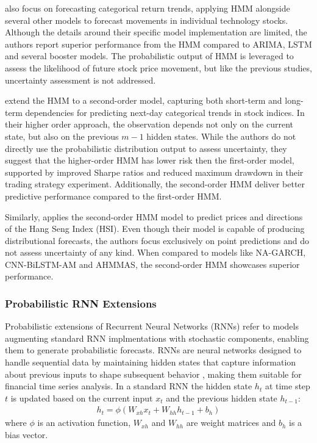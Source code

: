 \textcite{sher2023exploiting} also focus on forecasting categorical return trends, applying HMM alongside several other models to forecast movements in individual technology stocks. Although the details around their specific model implementation are limited, the authors report superior performance from the HMM compared to ARIMA, LSTM and several booster models. The probabilistic output of HMM is leveraged to assess the likelihood of future stock price movement, but like the previous studies, uncertainty assessment is not addressed. 

\textcite{zhang2019high} extend the HMM to a second-order model, capturing both short-term and long-term dependencies for predicting next-day categorical trends in stock indices. In their higher order approach, the observation depends not only on the current state, but also on the previous $m-1$ hidden states. While the authors do not directly use the probabilistic distribution output to assess uncertainty, they suggest that the higher-order HMM has lower risk then the first-order model, supported by improved Sharpe ratios and reduced maximum drawdown in their trading strategy experiment. Additionally, the second-order HMM deliver better predictive performance compared to the first-order HMM.

Similarly, \textcite{su2022hmm} applies the second-order HMM model to predict prices and directions of the Hang Seng Index (HSI). Even though their model is capable of producing distributional forecasts, the authors focus exclusively on point predictions and do not assess uncertainty of any kind. When compared to models like NA-GARCH, CNN-BiLSTM-AM and AHMMAS, the second-order HMM showcases superior performance. 




\subsubsection{Probabilistic RNN Extensions}
\label{sec:prob_rnn}

Probabilistic extensions of Recurrent Neural Networks (RNNs) refer to models augmenting standard RNN implmentations with stochastic components, enabling them to generate probabilistic forecasts. RNNs are neural networks designed to handle sequential data by maintaining hidden states that capture information about previous inputs to shape subsequent behavior \parencite{Elman1990Finding}, making them suitable for financial time series analysis. In a standard RNN the hidden state $h_t$ at time step $t$ is updated based on the current input $x_t$ and the previous hidden state $h_{t-1}$:
\begin{equation}
    \begin{gathered}
        h_t = \phi(W_{xh}x_t + W_{hh}h_{t-1} + b_h)
    \end{gathered}
\end{equation}
where $\phi$ is an activation function, $W_{xh}$ and $W_{hh}$ are weight matrices and $b_h$ is a bias vector. 


